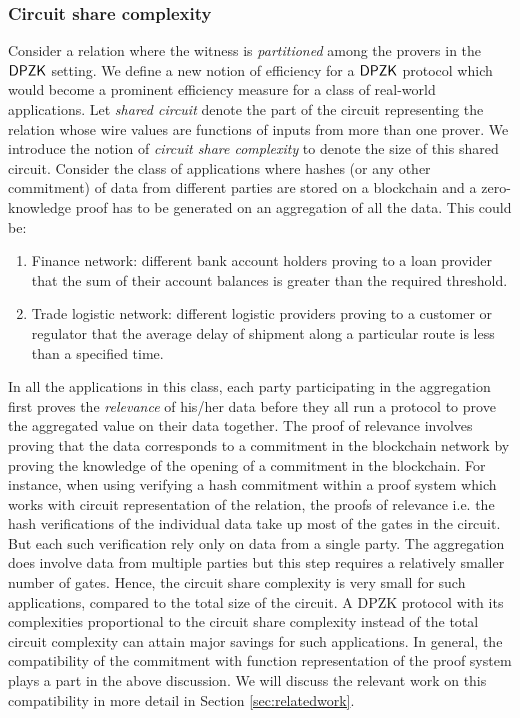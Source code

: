 \subsubsection{Circuit share complexity}
Consider a relation where the witness is \textit{partitioned} among the provers in the $\mathsf{DPZK}$ setting. We define a new notion of efficiency for a $\mathsf{DPZK}$ protocol which would become a prominent efficiency measure for a class of real-world applications.
Let \textit{shared circuit} denote the part of the circuit representing the relation whose wire values are functions of inputs from more than one prover. 
We introduce the notion of \textit{circuit share complexity} to denote the size of this shared circuit.
Consider the class of applications where hashes (or any other commitment) of data from different parties are stored on a blockchain and a zero-knowledge proof has to be generated on an aggregation of all the data. This could be: 
\begin{enumerate}
\item Finance network: different bank account holders proving to a loan provider that the sum of their account balances is greater than the required threshold.
\item Trade logistic network: different logistic providers proving to a customer or regulator that the average delay of shipment along a particular route is less than a specified time.
\end{enumerate}
In all the applications in this class, each party participating in the aggregation first proves the \textit{relevance} of his/her data before they all run a protocol to prove the aggregated value on their data together. The proof of relevance involves proving that the data corresponds to a commitment in the blockchain network by proving the knowledge of the opening of a commitment in the blockchain. 
For instance, when using verifying a hash commitment within a proof system which works with circuit representation of the relation, the proofs of relevance i.e. the hash verifications of the individual data take up most of the gates in the circuit. But each such verification rely only on data from a single party. The aggregation does involve data from multiple parties but this step requires a relatively smaller number of gates. Hence, the circuit share complexity is very small for such applications, compared to the total size of the circuit. A DPZK protocol with its complexities proportional to the circuit share complexity instead of the total circuit complexity can attain major savings for such applications.
In general, the compatibility of the commitment with function representation of the proof system plays a part in the above discussion. We will discuss the relevant work on this compatibility in more detail in Section \ref{sec:relatedwork}.

